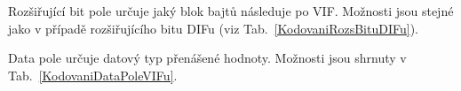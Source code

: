 \newpage

Rozšiřující bit pole určuje jaký blok bajtů následuje po VIF. Možnosti jsou stejné jako v případě rozšiřujícího bitu DIFu (viz Tab.~\ref{KodovaniRozsBituDIFu}).


Data pole určuje datový typ přenášené hodnoty. Možnosti jsou shrnuty v Tab.~\ref{KodovaniDataPoleVIFu}.

